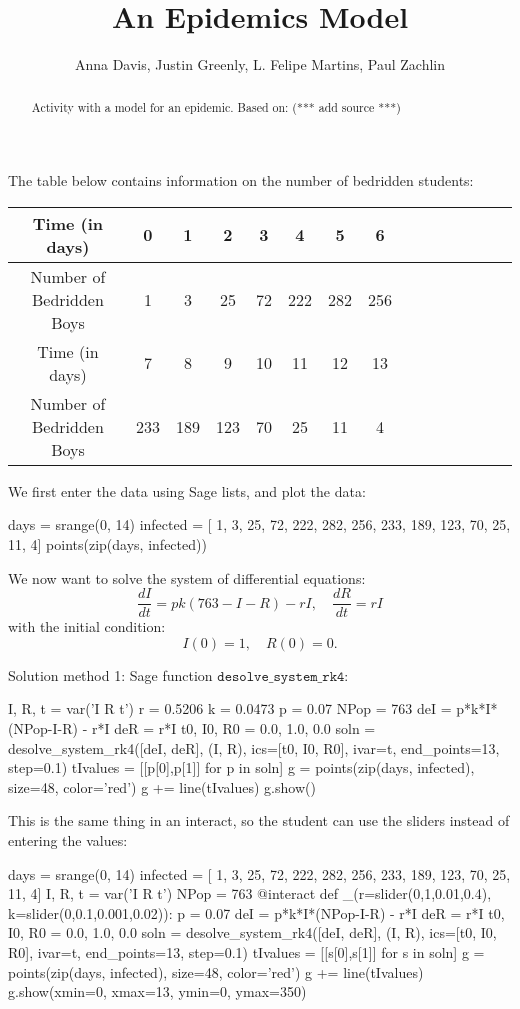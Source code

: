 \documentclass{ximera}
\title{An Epidemics Model}
\author{Anna Davis, Justin Greenly, L. Felipe Martins, Paul Zachlin}
\begin{document}
\begin{abstract}
Activity with a model for an epidemic. Based on: (*** add source ***)
\end{abstract}

\maketitle

The table below contains information on the number of bedridden students:

\begin{tabular}{|c|c|c|c|c|c|c|c|c|c|c|c|c|c|c|}\hline
Time (in days)           & 0 & 1 &  2 &  3 &  4 &    5 &   6  \\\hline
Number of Bedridden Boys & 1 & 3 & 25 & 72 & 222 & 282 & 256 \\\hline\hline
Time (in days) &             7 &   8 &   9 & 10 & 11 & 12 & 13\\\hline
Number of Bedridden Boys & 233 & 189 & 123 & 70 & 25 & 11 &  4\\\hline
\end{tabular}

We first enter the data using Sage lists, and plot the data:

\begin{sageCell}
days = srange(0, 14)
infected = [  1,   3,  25, 72, 222, 282, 256, 
            233, 189, 123, 70,  25,  11,   4]
points(zip(days, infected))
\end{sageCell}

We now want to solve the system of differential equations:
\[
\frac{dI}{dt}=pk(763-I-R)-rI,\quad\frac{dR}{dt}=rI
\]
with the initial condition:
\[
I(0)=1,\quad R(0)=0.
\]

Solution method 1: Sage function $\mathtt{desolve\_system\_rk4}$:

\begin{sageCell}
I, R, t = var('I R t')
r = 0.5206
k = 0.0473
p = 0.07
NPop = 763
deI = p*k*I*(NPop-I-R) - r*I
deR = r*I
t0, I0, R0 = 0.0, 1.0, 0.0
soln = desolve_system_rk4([deI, deR], (I, R), 
                          ics=[t0, I0, R0], ivar=t,
                          end_points=13, step=0.1)
tIvalues = [[p[0],p[1]] for p in soln]
g = points(zip(days, infected), size=48, color='red')
g += line(tIvalues)
g.show()
\end{sageCell}

This is the same thing in an interact, so the student can use the sliders instead of entering the values:
\begin{sageCell}
days = srange(0, 14)
infected = [  1,   3,  25, 72, 222, 282, 256,
            233, 189, 123, 70,  25,  11,   4]
I, R, t = var('I R t')
NPop = 763
@interact
def _(r=slider(0,1,0.01,0.4),
      k=slider(0,0.1,0.001,0.02)):
    p = 0.07
    deI = p*k*I*(NPop-I-R) - r*I
    deR = r*I
    t0, I0, R0 = 0.0, 1.0, 0.0
    soln = desolve_system_rk4([deI, deR], (I, R),
                               ics=[t0, I0, R0], ivar=t,
                               end_points=13, step=0.1)
    tIvalues = [[s[0],s[1]] for s in soln]
    g = points(zip(days, infected), size=48, color='red')
    g += line(tIvalues)
    g.show(xmin=0, xmax=13, ymin=0, ymax=350)
\end{sageCell}
\end{document}
